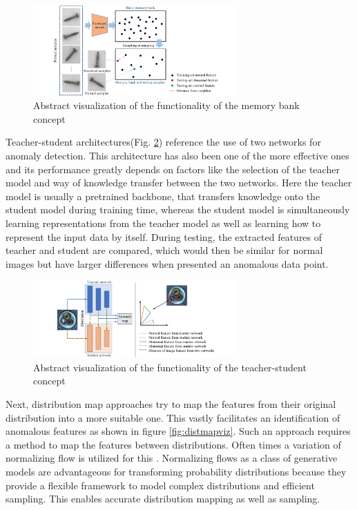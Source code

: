 \begin{figure}[H]
    \centering
    \includegraphics[width=0.7\textwidth]{figures/approachvizgeneral/memorybankviz.jpg}
    \caption{Abstract visualization of the functionality of the memory bank concept \cite{liu2024deep}}
    \label{fig:memorybankviz}
\end{figure}


Teacher-student architectures(Fig. \ref{fig:TSviz}) reference the use of two networks for anomaly detection. 
This architecture has also been one of the more effective ones and its performance greatly depends on factors like the selection of the teacher model and way 
of knowledge transfer between the two networks. Here the teacher model is usually a pretrained 
backbone, that transfers knowledge onto the student model during training time, whereas the student model is simultaneously learning representations from the teacher model as well as learning 
how to represent the input data by itself. During testing, the extracted features of teacher and student are compared, which would then be similar for normal images but have larger differences 
when presented an anomalous data point.\newline


\begin{figure}[H]
    \centering
    \includegraphics[width=0.7\textwidth]{figures/approachvizgeneral/TSviz.jpg}
    \caption{Abstract visualization of the functionality of the teacher-student concept \cite{liu2024deep}}
    \label{fig:TSviz}
\end{figure}



Next, distribution map approaches try to map the features from their original distribution into a more suitable one. This vastly facilitates an identification of anomalous features as shown in 
figure \ref{fig:distmapviz}. Such an approach requires a method to map the features between distributions. Often times a variation of normalizing flow is utilized for this \cite{liu2024deep}. 
Normalizing flows as a class of generative models \cite{Kobyzev_2021normalizingflowexplanation} are advantageous for transforming probability distributions because they provide a flexible 
framework to model complex distributions and efficient sampling. This enables accurate distribution mapping as well as sampling. \newline


